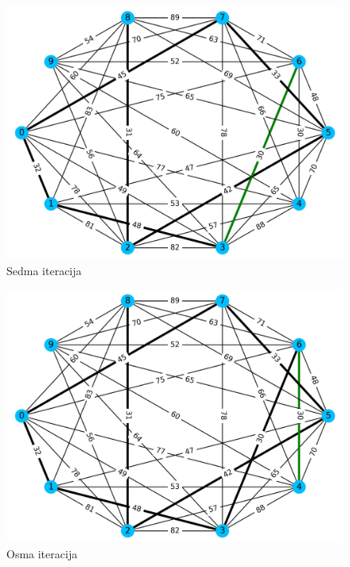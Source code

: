 \documentclass[conference]{IEEEtran}
\begin{document}
\begin{figure}[H]
\centering
\includegraphics[width=1\linewidth]{slike/300dpi/7d.jpg}
\caption{Sedma iteracija}
\label{figmat}
\end{figure}

\begin{figure}[H]
\centering
\includegraphics[width=1\linewidth]{slike/300dpi/8d.jpg}
\caption{Osma iteracija}
\label{figmat}
\end{figure}
\end{document}
